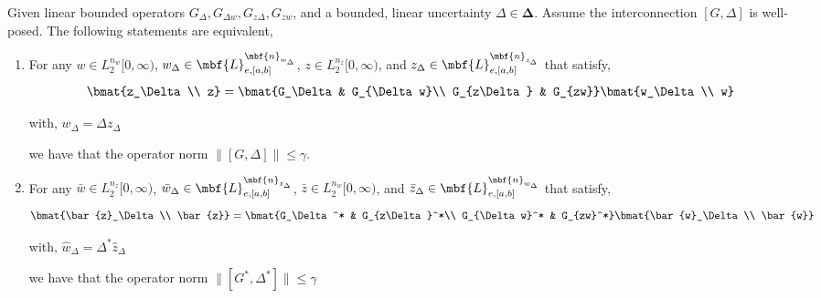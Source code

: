 \begin{lemma}\label{thm:duality}
Given linear bounded operators $G_\Delta, G_{\Delta w}, G_{z\Delta}, G_{zw}$, and a bounded, linear uncertainty $\Delta \in \mathbf{\Delta}$. Assume the interconnection $[G, \Delta]$ is well-posed. The following statements are equivalent,
\begin{enumerate}
\item For any $w\in L_2^{n_w}[0,\infty)$, $w_\Delta\in\mbf{L}_{e,[a,b]}^{\mbf{n}_{w_\Delta}}$, $z\in L_2^{n_z}[0,\infty)$, and $z_\Delta \in \mbf{L}_{e,[a,b]}^{\mbf{n}_{z_\Delta}}$ that satisfy,
        \begin{equation}\label{eqn:primal_system}
            \bmat{z_\Delta\\ z}=\bmat{G_\Delta & G_{\Delta w}\\ G_{z\Delta} & G_{zw}}\bmat{w_\Delta \\ w}
        \end{equation}
        \begin{center}
            with, $w_\Delta = \Delta z_\Delta$
        \end{center}
        we have that the operator norm $\|[G,\Delta]\| \leq \gamma$.
\item For any $\bar{w}\in L_2^{n_z}[0,\infty)$, $\bar{w}_\Delta\in\mbf{L}_{e,[a,b]}^{\mbf{n}_{z_\Delta}}$, $\bar{z}\in L_2^{n_w}[0,\infty)$, and $\bar{z}_\Delta \in \mbf{L}_{e,[a,b]}^{\mbf{n}_{w_\Delta}}$ that satisfy,
        \begin{equation}\label{eqn:dual_system}
            \bmat{\bar{z}_\Delta\\ \bar{z}}=\bmat{G_\Delta^* & G_{z\Delta}^*\\ G_{\Delta w}^* & G_{zw}^*}\bmat{\bar{w}_\Delta \\ \bar{w}}
        \end{equation}
        \begin{center}
            with, $\hat{w}_\Delta = \Delta^* \hat{z}_\Delta$
        \end{center}
        we have that the operator norm $\|[G^*,\Delta^*]\|\leq \gamma$
\end{enumerate}
\end{lemma}
